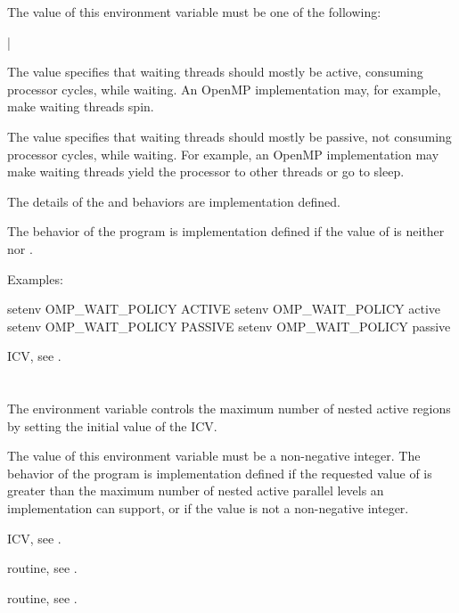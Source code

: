 The value of this environment variable must be one of the following:

{|}

The  value specifies that waiting threads should mostly be
active, consuming processor cycles, while waiting. An OpenMP implementation
may, for example, make waiting threads spin.

The  value specifies that waiting threads should mostly be
passive, not consuming processor cycles, while waiting. For example, an
OpenMP implementation may make waiting threads yield the processor to
other threads or go to sleep.

The details of the  and  behaviors are
implementation defined.

The behavior of the program is implementation defined if the value of
 is neither  nor .

Examples:
\begin{ompEnv}
setenv OMP_WAIT_POLICY ACTIVE
setenv OMP_WAIT_POLICY active
setenv OMP_WAIT_POLICY PASSIVE
setenv OMP_WAIT_POLICY passive
\end{ompEnv}

\begin{crossrefs}
\item {} ICV, see .
\end{crossrefs}



\section{}
\label{sec:OMP_MAX_ACTIVE_LEVELS}
The  environment variable controls the maximum number
of nested active  regions by setting the initial value of the
 ICV.

The value of this environment variable must be a non-negative integer. The
behavior of the program is implementation defined if the requested value of
 is greater than the maximum number of nested
active parallel levels an implementation can support, or if the value is not a
non-negative integer.

\begin{crossrefs}
\item {} ICV, see .

\item {} routine,
see .

\item {} routine,
see .
\end{crossrefs}



